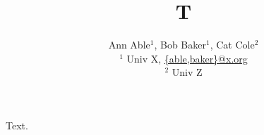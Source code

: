 \documentclass{article}
\begin{document}
\title{T}
\author{Ann Able$^1$, Bob Baker$^1$, Cat Cole$^2$ \\
$^1$ Univ X, \href{mailto:able@x.org}{\{able,baker\}@x.org} \\
$^2$ Univ Z}
\maketitle
Text.
\end{document}

